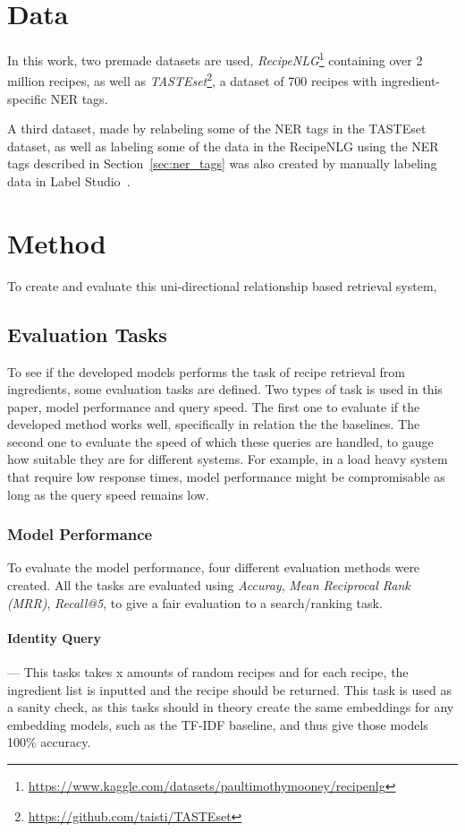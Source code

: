 \documentclass[11pt]{article}
\begin{document}
\section{Data}
In this work, two premade datasets are used,
\emph{RecipeNLG}\footnote{\url{https://www.kaggle.com/datasets/paultimothymooney/recipenlg}}
containing over 2 million recipes, as well as
\emph{TASTEset}\footnote{\url{https://github.com/taisti/TASTEset}}, a dataset of
700 recipes with ingredient-specific NER tags.

A third dataset, made by relabeling some of the NER tags in the TASTEset dataset,
as well as labeling some of the data in the RecipeNLG using the NER tags
described in Section~\ref{sec:ner_tags} was also created by manually labeling
data in Label Studio~\cite{LabelStudio}.

\section{Method}
To create and evaluate this uni-directional relationship based retrieval system, 

\subsection{Evaluation Tasks}
To see if the developed models performs the task of recipe retrieval from
ingredients, some evaluation tasks are defined.
Two types of task is used in this paper, model performance and query speed.
The first one to evaluate if the developed method works well, specifically in
relation the the baselines.
The second one to evaluate the speed of which these queries are handled, to
gauge how suitable they are for different systems.
For example, in a load heavy system that require low response times, model
performance might be compromisable as long as the query speed remains low.

\subsubsection{Model Performance}\label{sec:modelperfomance}
To evaluate the model performance, four different evaluation methods were
created.
All the tasks are evaluated using \emph{Accuray},
\emph{Mean Reciprocal Rank (MRR)}, \emph{Recall@5}, to give a fair evaluation to
a search/ranking task.

\paragraph{Identity Query} --- This tasks takes x amounts of random recipes
and for each recipe, the ingredient list is inputted and the recipe should be
returned.
This task is used as a sanity check, as this tasks should in theory create the
same embeddings for any embedding models, such as the TF-IDF baseline, and thus
give those models 100\% accuracy.
\end{document}
